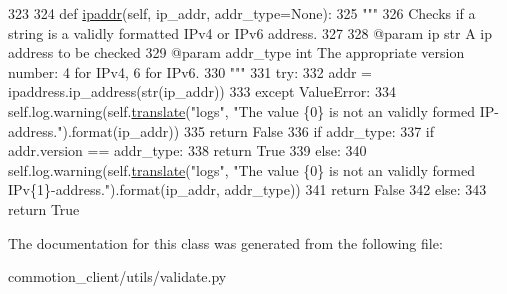\begin{DoxyCode}
323 
324     \textcolor{keyword}{def }\hyperlink{classcommotion__client_1_1utils_1_1validate_1_1Networking_aaeee5dedbe589a997ddf820b17359c35}{ipaddr}(self, ip\_addr, addr\_type=None):
325         \textcolor{stringliteral}{"""}
326 \textcolor{stringliteral}{        Checks if a string is a validly formatted IPv4 or IPv6 address.}
327 \textcolor{stringliteral}{}
328 \textcolor{stringliteral}{        @param ip str A ip address to be checked}
329 \textcolor{stringliteral}{        @param addr\_type int The appropriate version number: 4 for IPv4, 6 for IPv6.}
330 \textcolor{stringliteral}{        """}
331         \textcolor{keywordflow}{try}:
332             addr = ipaddress.ip\_address(str(ip\_addr))
333         \textcolor{keywordflow}{except} ValueError:
334             self.log.warning(self.\hyperlink{classcommotion__client_1_1utils_1_1validate_1_1Networking_a2728d53728c499c4da34412a8b773216}{translate}(\textcolor{stringliteral}{"logs"}, \textcolor{stringliteral}{"The value \{0\} is not an validly formed
       IP-address."}).format(ip\_addr))
335             \textcolor{keywordflow}{return} \textcolor{keyword}{False}
336         \textcolor{keywordflow}{if} addr\_type:
337             \textcolor{keywordflow}{if} addr.version == addr\_type:
338                 \textcolor{keywordflow}{return} \textcolor{keyword}{True}
339             \textcolor{keywordflow}{else}:
340                 self.log.warning(self.\hyperlink{classcommotion__client_1_1utils_1_1validate_1_1Networking_a2728d53728c499c4da34412a8b773216}{translate}(\textcolor{stringliteral}{"logs"}, \textcolor{stringliteral}{"The value \{0\} is not an validly formed
       IPv\{1\}-address."}).format(ip\_addr, addr\_type))
341                 \textcolor{keywordflow}{return} \textcolor{keyword}{False}
342         \textcolor{keywordflow}{else}:
343             \textcolor{keywordflow}{return} \textcolor{keyword}{True}
\end{DoxyCode}


The documentation for this class was generated from the following file\-:\begin{DoxyCompactItemize}
\item 
commotion\-\_\-client/utils/validate.\-py\end{DoxyCompactItemize}
